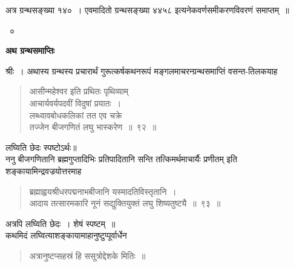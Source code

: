 \documentclass[11pt, openany]{book}
\begin{document}
अत्र ग्रन्थसङ्ख्या १४०~। एवमादितो ग्रन्थसङ्ख्या ४४५८ इत्यनेकवर्णसमीकरणविवरणं समाप्तम्~॥ 

\begin{center}
     \textendash\textendash~० \textendash\textendash
\end{center}

\newpage

 \label{grantha}
\begin{center}
    \textbf{\LARGE अथ ग्रन्थसमाप्तिः }
\end{center}

\vspace{2mm}
 श्रीः~। अथास्य ग्रन्थस्य प्रचारार्थं गुरूत्कर्षकथनरूपं मङ्गलमाचरन्ग्रन्थसमाप्तिं वसन्त-तिलकयाह\textendash 
\begin{quote}
    \bs
      आसीन्महेश्वर इति प्रथितः पृथिव्याम् \\

\vspace{-7mm}
\hspace{1cm} आचार्यवर्यपदवीं विदुषां प्रयातः~। \\

\vspace{-7mm}
 लब्ध्वावबोधकलिकां तत एव चक्रे \\

\vspace{-7mm}
\hspace{1cm} तज्जेन बीजगणितं लघु भास्करेण~॥~९२~॥~
\end{quote}

लघ्विति छेदः स्पष्टोऽर्थः॥ \\

\vspace{-3mm}
 ननु बीजगणितानि ब्रह्मगुप्तादिभिः प्रतिपादितानि सन्ति तत्किमर्थमाचार्यैः प्रणीतम् इति शङ्कायामिन्द्रवज्रयोत्तरमाह\textendash 
\begin{quote}
    \bs
 ब्रह्माह्वयश्रीधरपद्मनाभबीजानि यस्मादतिविस्तृतानि~। \\
 आदाय तत्सारमकारि नूनं सद्युक्तियुक्तं लघु शिष्यतुष्ट्यै~॥~९३~॥~
\end{quote}

अत्रपि लघ्विति छेदः~। शेषं स्पष्टम्~॥ \\

\vspace{-3mm}
 कथमिदं लघ्वित्याशङ्कायामाहानुष्टुप्पूर्वार्धेन\textendash 
\begin{quote}
    \bs
     अत्रानुष्टप्सहस्रं हि ससूत्रोद्देशके मितिः~॥ 
\end{quote}
\end{document}
